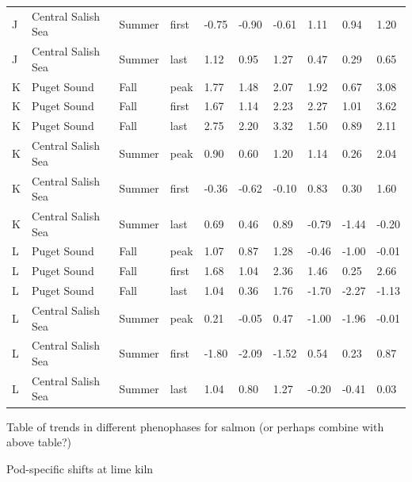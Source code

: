 \documentclass{article}
\begin{document}
\begin{table}[ht]
\begin{tabular}{|p{}|p{}|p{}|p{}|p{}p{}p{}|p{}p{}p{}|}
  J & Central Salish Sea & Summer & first & -0.75 & -0.90 & -0.61 & 1.11 & 0.94 & 1.20 \\ 
  J & Central Salish Sea & Summer & last & 1.12 & 0.95 & 1.27 & 0.47 & 0.29 & 0.65 \\ 
   \hline
K & Puget Sound & Fall & peak & 1.77 & 1.48 & 2.07 & 1.92 & 0.67 & 3.08 \\ 
  K & Puget Sound & Fall & first & 1.67 & 1.14 & 2.23 & 2.27 & 1.01 & 3.62 \\ 
  K & Puget Sound & Fall & last & 2.75 & 2.20 & 3.32 & 1.50 & 0.89 & 2.11 \\ 
  K & Central Salish Sea & Summer & peak & 0.90 & 0.60 & 1.20 & 1.14 & 0.26 & 2.04 \\ 
  K & Central Salish Sea & Summer & first & -0.36 & -0.62 & -0.10 & 0.83 & 0.30 & 1.60 \\ 
  K & Central Salish Sea & Summer & last & 0.69 & 0.46 & 0.89 & -0.79 & -1.44 & -0.20 \\ 
   \hline
L & Puget Sound & Fall & peak & 1.07 & 0.87 & 1.28 & -0.46 & -1.00 & -0.01 \\ 
  L & Puget Sound & Fall & first & 1.68 & 1.04 & 2.36 & 1.46 & 0.25 & 2.66 \\ 
  L & Puget Sound & Fall & last & 1.04 & 0.36 & 1.76 & -1.70 & -2.27 & -1.13 \\ 
  L & Central Salish Sea & Summer & peak & 0.21 & -0.05 & 0.47 & -1.00 & -1.96 & -0.01 \\ 
  L & Central Salish Sea & Summer & first & -1.80 & -2.09 & -1.52 & 0.54 & 0.23 & 0.87 \\ 
  L & Central Salish Sea & Summer & last & 1.04 & 0.80 & 1.27 & -0.20 & -0.41 & 0.03 \\ 
   \hline
\end{tabular}
\endgroup
\end{table}
\par Table of trends in different phenophases for salmon (or perhaps combine with above table?)

\par Pod-specific shifts at lime kiln
\end{document}
